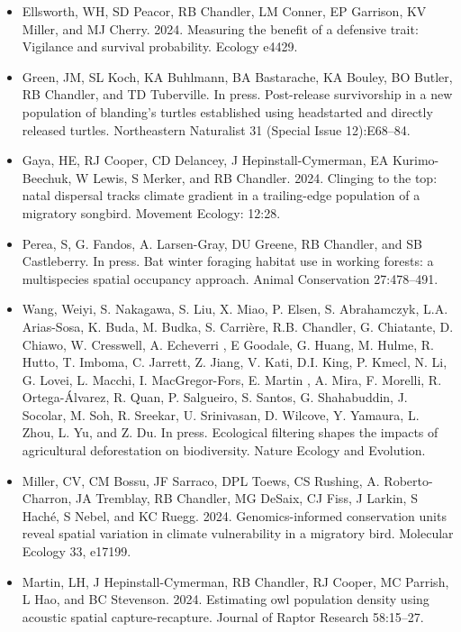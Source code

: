 \documentclass[12pt]{article}
\begin{document}
\begin{itemize}
\item Ellsworth, WH, SD Peacor, RB Chandler, LM Conner, EP
  Garrison, KV Miller, and MJ Cherry. 2024. Measuring the benefit of a
  defensive trait: Vigilance and survival probability. Ecology e4429. 

\item Green, JM, SL Koch, KA Buhlmann, BA Bastarache, KA Bouley, BO
  Butler, RB Chandler, and TD Tuberville. In press. Post-release
  survivorship in a new population of blanding’s turtles established
  using headstarted and directly released turtles. Northeastern
  Naturalist 31 (Special Issue 12):E68--84.   

\item  Gaya, HE, RJ Cooper, CD Delancey, J Hepinstall-Cymerman, EA
  Kurimo-Beechuk, W Lewis, S Merker, and RB Chandler. 2024. Clinging
  to the top: natal dispersal tracks climate gradient in a
  trailing-edge population of a migratory songbird. Movement
  Ecology: 12:28.  

\item Perea, S, G. Fandos, A. Larsen-Gray, DU Greene, RB Chandler, and
  SB Castleberry. In press. Bat winter foraging habitat use in working
  forests: a multispecies spatial occupancy approach. Animal
  Conservation 27:478--491.

\item Wang, Weiyi, S. Nakagawa, S. Liu, X. Miao, P. Elsen,
  S. Abrahamczyk, L.A. Arias-Sosa, K. Buda, M. Budka, S. Carri\`{e}re,
  R.B. Chandler, G. Chiatante, D. Chiawo, W. Cresswell, A. Echeverri ,
  E Goodale, G. Huang, M. Hulme, R. Hutto, T. Imboma, C. Jarrett,
  Z. Jiang, V. Kati, D.I. King, P. Kmecl, N. Li, G. Lovei, L. Macchi,
  I. MacGregor-Fors, E. Martin , A. Mira, F. Morelli,
  R. Ortega-\'{A}lvarez, R. Quan, P. Salgueiro, S. Santos,
  G. Shahabuddin, J. Socolar, M. Soh, R. Sreekar, U. Srinivasan,
  D. Wilcove, Y. Yamaura, L. Zhou, L. Yu, and Z. Du. In
  press. Ecological filtering shapes the impacts of agricultural
  deforestation on biodiversity. Nature Ecology and Evolution. 

\item Miller, CV, CM Bossu, JF Sarraco, DPL Toews, CS Rushing,
  A. Roberto-Charron, JA Tremblay, RB Chandler, MG DeSaix, CJ Fiss, J
  Larkin, S Hach\'e, S Nebel, and KC Ruegg. 2024. Genomics-informed
  conservation units reveal spatial variation in climate vulnerability
  in a migratory bird. Molecular Ecology 33, e17199.

\item Martin, LH, J Hepinstall-Cymerman, RB Chandler, RJ Cooper, MC
  Parrish, L Hao, and BC Stevenson. 2024. Estimating owl population
  density using acoustic spatial capture-recapture. Journal of Raptor
  Research 58:15--27. 


\end{itemize}
\end{document}
